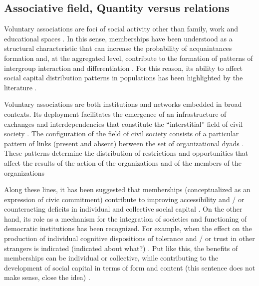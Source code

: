 \subsection{Associative field, Quantity versus relations}

Voluntary associations are foci of social activity other than family, work and educational spaces \parencite{knoke_associations_1986}. In this sense, memberships have been understood as a structural characteristic that can increase the probability of acquaintances formation \parencite{mcpherson_hypernetwork_1982} and, at the aggregated level, contribute to the formation of patterns of intergroup interaction and differentiation \parencite{blau_exchange_1986}. For this reason, its ability to affect social capital distribution patterns in populations has been highlighted by the literature \parencite{benton_uniters_2016,diani_social_1997,feld_focused_1981,glanville_voluntary_2004,son_social_2008,tindall_network_2012}.
\bigskip

Voluntary associations are both institutions and networks embedded in broad contexts. Its deployment facilitates the emergence of an infrastructure of exchanges and interdependencies that constitute the “interstitial” field of civil society \parencite{crossley_networks_2018,diani_cement_2015,lee_when_2016}. The configuration of the field of civil society consists of a particular pattern of links (present and absent) between the set of organizational dyads \parencite{kenis_how_2002}. These patterns determine the distribution of restrictions and opportunities that affect the results of the action of the organizations and of the members of the organizations \parencite{paxton_association_2007,son_social_2008,tindall_network_2012} 
\bigskip

Along these lines, it has been suggested that memberships (conceptualized as an expression of civic commitment) contribute to improving accessibility and / or counteracting deficits in individual and collective social capital \parencite{benton_uniters_2016,small_villa_2004,son_social_2008}. On the other hand, its role as a mechanism for the integration of societies and functioning of democratic institutions has been recognized. For example, when the effect on the production of individual cognitive dispositions of tolerance and / or trust in other strangers is indicated {\color{blue} (indicated about what?)}  \parencite{cote_social_2015,putnam_bowling_2000,tocqueville_democracy_1980}. Put like this, the benefits of memberships can be individual or collective, while contributing to the development of social capital in terms of form and content {\color{blue} (this sentence does not make sense, close the idea)}  \parencite{moody_building_2009}. 
\bigskip

